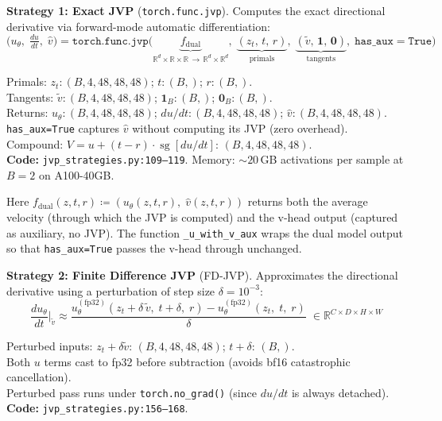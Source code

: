 \documentclass[11pt,a4paper]{article}
\newcommand{\code}[1]{\texttt{#1}}
\DeclareMathOperator{\sg}{sg}        %
\begin{document}
\textbf{Strategy 1: Exact JVP} (\code{torch.func.jvp}).  Computes the exact
directional derivative via forward-mode automatic differentiation:
\begin{equation}
  \bigl(u_\theta,\;\tfrac{du}{dt},\;\hat{v}\bigr)
    = \texttt{torch.func.jvp}\!\bigl(
        \underbrace{f_{\mathrm{dual}}}_{\mathbb{R}^d \times \mathbb{R} \times \mathbb{R} \,\to\, \mathbb{R}^d \times \mathbb{R}^d},\;
        \underbrace{(z_t,\,t,\,r)}_{\text{primals}},\;
        \underbrace{(\tilde{v},\,\mathbf{1},\,\mathbf{0})}_{\text{tangents}},\;
        \texttt{has\_aux}{=}\texttt{True}\bigr)
  \label{eq:exact_jvp}
\end{equation}
\begin{shapes}
Primals: $z_t \!:\! (B, 4, 48, 48, 48)$; $t \!:\! (B,)$; $r \!:\! (B,)$.\\
Tangents: $\tilde{v} \!:\! (B, 4, 48, 48, 48)$; $\mathbf{1}_B \!:\! (B,)$; $\mathbf{0}_B \!:\! (B,)$.\\
Returns: $u_\theta \!:\! (B, 4, 48, 48, 48)$; $du/dt \!:\! (B, 4, 48, 48, 48)$; $\hat{v} \!:\! (B, 4, 48, 48, 48)$.\\
\code{has\_aux=True} captures $\hat{v}$ without computing its JVP (zero overhead).\\
Compound: $V = u + (t-r) \cdot \sg[du/dt]$: $(B, 4, 48, 48, 48)$.\\
\textbf{Code:} \code{jvp\_strategies.py:109--119}.
Memory: ${\sim}20$\,GB activations per sample at $B{=}2$ on A100-40GB.
\end{shapes}

\noindent
Here $f_{\mathrm{dual}}(z,t,r) \coloneqq (u_\theta(z,t,r),\;\hat{v}(z,t,r))$
returns both the average velocity (through which the JVP is computed) and the
v-head output (captured as auxiliary, no JVP).  The function
\code{\_u\_with\_v\_aux} wraps the dual model output so that
\code{has\_aux=True} passes the v-head through unchanged.

\textbf{Strategy 2: Finite Difference JVP} (FD-JVP).  Approximates the
directional derivative using a perturbation of step size
$\delta = 10^{-3}$:
\begin{equation}
  \frac{du_\theta}{dt}\bigg|_{\tilde{v}}
    \approx \frac{
      u_\theta^{\mathrm{(fp32)}}(z_t + \delta\,\tilde{v},\;t + \delta,\;r)
      - u_\theta^{\mathrm{(fp32)}}(z_t,\;t,\;r)
    }{\delta}
    \;\in \mathbb{R}^{C \times D \times H \times W}
  \label{eq:fd_jvp}
\end{equation}
\begin{shapes}
Perturbed inputs: $z_t + \delta\tilde{v}$: $(B, 4, 48, 48, 48)$; $t + \delta$: $(B,)$.\\
Both $u$ terms cast to fp32 before subtraction (avoids bf16 catastrophic cancellation).\\
Perturbed pass runs under \code{torch.no\_grad()} (since $du/dt$ is always detached).\\
\textbf{Code:} \code{jvp\_strategies.py:156--168}.
\end{shapes}
\end{document}
